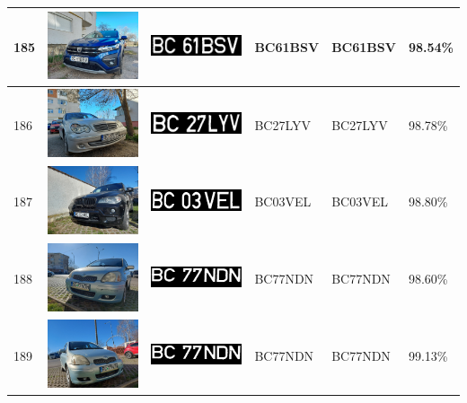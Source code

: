 \documentclass[a4paper,12pt]{report}
\begin{document}
\begin{longtable}{| m{0.6cm} | m{3cm} | m{3cm} | m{1.8cm} | m{1.8cm} | m{1.8cm} |}
        185 & \includegraphics[width=3cm,keepaspectratio]{dataset/114_s1.jpg} & \includegraphics[width=3cm,keepaspectratio]{segmentari/185.jpg} & BC61BSV & BC61BSV & 98.54\% \\ \hline
        186 & \includegraphics[width=3cm,keepaspectratio]{dataset/115_s1.jpg} & \includegraphics[width=3cm,keepaspectratio]{segmentari/186.jpg} & BC27LYV & BC27LYV & 98.78\% \\ \hline
        187 & \includegraphics[width=3cm,keepaspectratio]{dataset/116_d1.jpg} & \includegraphics[width=3cm,keepaspectratio]{segmentari/187.jpg} & BC03VEL & BC03VEL & 98.80\% \\ \hline
        188 & \includegraphics[width=3cm,keepaspectratio]{dataset/117_d1.jpg} & \includegraphics[width=3cm,keepaspectratio]{segmentari/188.jpg} & BC77NDN & BC77NDN & 98.60\% \\ \hline
        189 & \includegraphics[width=3cm,keepaspectratio]{dataset/117_s1.jpg} & \includegraphics[width=3cm,keepaspectratio]{segmentari/189.jpg} & BC77NDN & BC77NDN & 99.13\% \\ \hline

\end{longtable}
\end{document}
